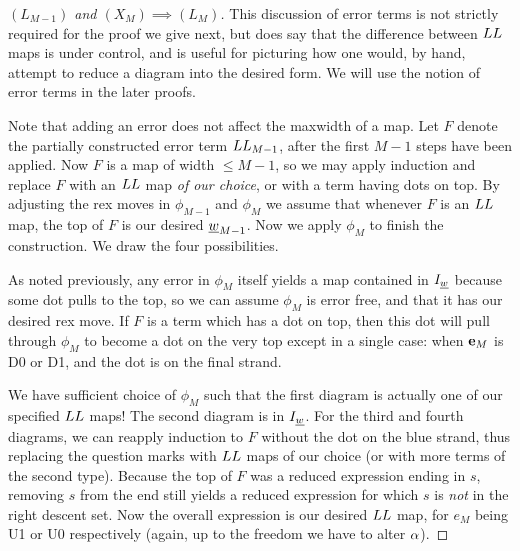 \begin{proof}[$(L_{M-1})$ and $(X_M) \implies (L_M)$]
This discussion of error terms is not strictly required for the proof we give next, but does say that the difference between $LL$ maps is under control, and is useful for picturing how
one would, by hand, attempt to reduce a diagram into the desired form. We will use the notion of error terms in the later proofs.

Note that adding an error does not affect the maxwidth of a map. Let $F$ denote the partially constructed error term $LL_{M-1}$, after the first $M-1$ steps have been applied. Now $F$ is
a map of width $\le M-1$, so we may apply induction and replace $F$ with an $LL$ map \emph{of our choice}, or with a term having dots on top. By adjusting the rex moves in $\phi_{M-1}$
and $\phi_M$ we assume that whenever $F$ is an $LL$ map, the top of $F$ is our desired ${\underline{w}}_{M-1}$. Now we apply $\phi_M$ to finish the construction. We draw the four possibilities.

As noted previously, any error in $\phi_M$ itself yields a map contained in $I_{\underline{w}}$ because some dot pulls to the top, so we can assume $\phi_M$ is error free, and that
it has our desired rex move. If $F$ is a term which has a dot on top, then this dot will pull through $\phi_M$ to become a dot on the very top except in a single case: when ${\mathbf e}_M$ is D0
or D1, and the dot is on the final strand.

We have sufficient choice of $\phi_M$ such that the first diagram is actually one of our specified $LL$ maps! The second diagram is in $I_{\underline{w}}$. For the third and fourth diagrams, we can
reapply induction to $F$ without the dot on the blue strand, thus replacing the question marks with $LL$ maps of our choice (or with more terms of the second type). Because the top of $F$
was a reduced expression ending in $s$, removing $s$ from the end still yields a reduced expression for which $s$ is \emph{not} in the right descent set. Now the overall expression is our
desired $LL$ map, for $e_M$ being U1 or U0 respectively (again, up to the freedom we have to alter $\alpha$). \end{proof}


